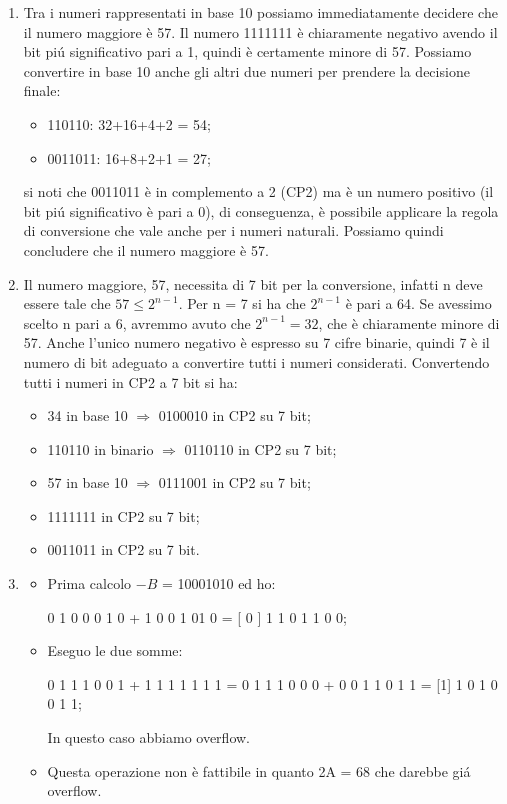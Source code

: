 \begin{Answer}[ref={ex:cp2}]
	\begin{enumerate}
		\item Tra i numeri rappresentati in base 10 possiamo immediatamente decidere che il numero maggiore \`e 57. Il numero 1111111 \`e 		chiaramente negativo avendo il bit pi\'u significativo pari a 1, quindi \`e certamente minore di 57. Possiamo convertire in base 10 anche gli altri due numeri per prendere la decisione finale:
		\begin{itemize}
			\item 110110:  32+16+4+2 = 54;
			\item 0011011:  16+8+2+1 = 27;
		\end{itemize}
si noti che 0011011 \`e in complemento a 2 (CP2) ma \`e un numero positivo (il bit pi\'u significativo \`e pari a 0), di conseguenza, \`e possibile applicare la regola di conversione che vale anche per i numeri naturali.
Possiamo quindi concludere che il numero maggiore \`e 57.
	\item Il numero maggiore, 57, necessita di 7 bit per la conversione, infatti n deve essere tale che $57 \leq 2^{n - 1}$. Per n = 7 si ha che $2^{n - 1}$ \`e pari a 64. Se avessimo scelto n pari a 6, avremmo avuto che $2^{n - 1} = 32$, che è chiaramente minore di 57. Anche l'unico numero negativo \`e espresso su 7 cifre binarie, quindi 7 \`e il numero di bit adeguato a convertire tutti i numeri considerati. Convertendo tutti i numeri in CP2 a 7 bit si ha:
		\begin{itemize}
			\item[A.] 34 in base 10 $\Rightarrow$ 0100010 in CP2 su 7 bit;
			\item[B.] 110110 in binario $\Rightarrow$ 0110110 in CP2 su 7 bit;
			\item[C.] 57 in base 10 $\Rightarrow$ 0111001 in CP2 su 7 bit;
			\item[D.] 1111111 in CP2 su 7 bit;
			\item[E.] 0011011 in CP2 su 7 bit.
		\end{itemize}
	\item 
	\begin{itemize}
		\item[I.] Prima calcolo $- B$ = 10001010 ed ho:
		
			0 1 0 0 0 1 0 + 1 0 0 1 01 0 = [ 0 ] 1 1 0 1 1 0 0;

		\item[II.] Eseguo le due somme:

			0 1 1 1 0 0 1 + 1 1 1 1 1 1 1 = 0 1 1 1 0 0 0 + 0 0 1 1 0 1 1 = [1] 1 0 1 0 0 1 1;

		In questo caso abbiamo overflow.
		\item[III.] Questa operazione non \`e fattibile in quanto 2A = 68 che darebbe gi\'a overflow.
	\end{itemize}
	\end{enumerate}

\end{Answer}